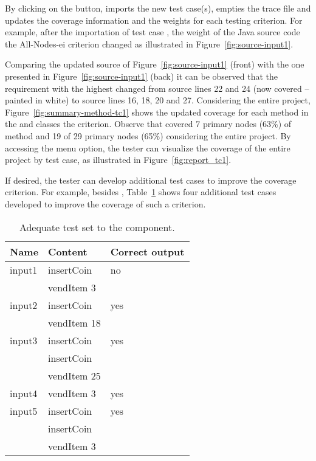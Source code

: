 

By clicking on the  button, \toolname imports the new
test case(s), empties the trace file  and
updates the coverage information and the weights for each testing
criterion. For example, after the importation of test case
, the weight of the Java source code \wrt the
All-Nodes-ei criterion changed as illustrated in
Figure~\ref{fig:source-input1}.



Comparing the updated source of Figure~\ref{fig:source-input1}
(front) with the one presented in Figure~\ref{fig:source-input1}
(back) it can be observed that the requirement with the highest
changed from source lines 22 and 24 (now covered -- painted in white) to
source lines 16, 18, 20 and 27. Considering the entire project,
Figure~\ref{fig:summary-method-tc1} shows the updated coverage for
each method in the  and  classes
\wrt the  criterion. Observe that 
covered 7 primary nodes (63\%) of  method
and 19 of 29 primary nodes (65\%) considering the entire project.
By accessing the 
menu option, the tester can visualize the coverage of the entire
project by test case, as illustrated in
Figure~\ref{fig:report_tc1}.



If desired, the tester can develop additional test cases to
improve the coverage \wrt {} criterion. For
example, besides , Table~\ref{tab:adequate} shows four
additional test cases developed to improve the coverage of such a
criterion.

\begin{table}[!ht]
\caption{Adequate test set to the 
component.}\label{tab:adequate}
\begin{center}
\begin{tabular}{|l|l|l|}\hline
\textbf{Name} & \textbf{Content} & \textbf{Correct output}\\
\hline
input1  &   insertCoin      & no  \\
        &   vendItem 3      &     \\ \hline
input2  &   insertCoin      & yes \\
        &   vendItem 18     &     \\ \hline
input3  &   insertCoin      & yes \\
        &   insertCoin      &     \\
        &   vendItem 25     &     \\ \hline
input4  &   vendItem 3      & yes \\ \hline
input5  &   insertCoin      & yes \\
        &   insertCoin      &     \\
        &   vendItem 3      &     \\ \hline
\end{tabular}
\end{center}
\end{table}

